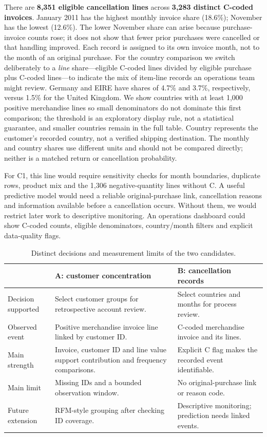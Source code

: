 \documentclass[10pt,a4paper]{article}
\newcommand{\sectionhead}[1]{\vspace{0.34em}{\large\bfseries\color{navy}#1}\par\vspace{0.08em}}
\begin{document}
There are \textbf{8,351 eligible cancellation lines} across \textbf{3,283 distinct C-coded invoices}. January 2011 has the highest monthly invoice share (18.6\%); November has the lowest (12.6\%). The lower November share can arise because purchase-invoice counts rose; it does not show that fewer prior purchases were cancelled or that handling improved. Each record is assigned to its own invoice month, not to the month of an original purchase. For the country comparison we switch deliberately to a \emph{line} share---eligible C-coded lines divided by eligible purchase plus C-coded lines---to indicate the mix of item-line records an operations team might review. Germany and EIRE have shares of 4.7\% and 3.7\%, respectively, versus 1.5\% for the United Kingdom. We show countries with at least 1,000 positive merchandise lines so small denominators do not dominate this first comparison; the threshold is an exploratory display rule, not a statistical guarantee, and smaller countries remain in the full table. Country represents the customer's recorded country, not a verified shipping destination. The monthly and country shares use different units and should not be compared directly; neither is a matched return or cancellation probability.

For C1, this line would require sensitivity checks for month boundaries, duplicate rows, product mix and the 1,306 negative-quantity lines without C. A useful predictive model would need a reliable original-purchase link, cancellation reasons and information available before a cancellation occurs. Without them, we would restrict later work to descriptive monitoring. An operations dashboard could show C-coded counts, eligible denominators, country/month filters and explicit data-quality flags.

\pagebreak
\sectionhead{4\quad Comparison, process framing and feedback}
\begin{table}[H]\centering\small
\caption{Distinct decisions and measurement limits of the two candidates.}
\begin{tabularx}{\linewidth}{@{}p{2.55cm}XX@{}}\toprule
 & A: customer concentration & B: cancellation records \\\midrule
Decision supported & Select customer groups for retrospective account review. & Select countries and months for process review. \\
Observed event & Positive merchandise invoice line linked by customer ID. & C-coded merchandise invoice and its lines. \\
Main strength & Invoice, customer ID and line value support contribution and frequency comparisons. & Explicit C flag makes the recorded event identifiable. \\
Main limit & Missing IDs and a bounded observation window. & No original-purchase link or reason code. \\
Future extension & RFM-style grouping after checking ID coverage. & Descriptive monitoring; prediction needs linked events. \\
\bottomrule\end{tabularx}
\end{table}
\end{document}
